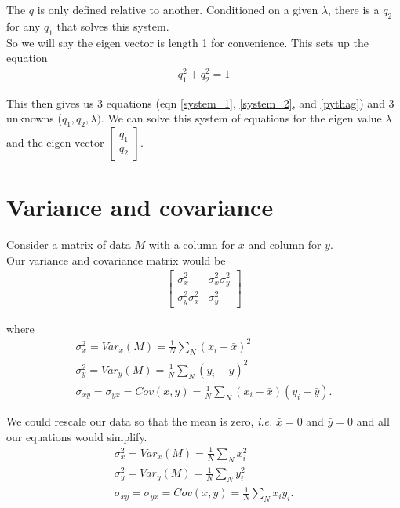 \documentclass{article}
\begin{document}
The $q$ is only defined relative to another. Conditioned on a given $\lambda$, there is a $q_2$ for any $q_1$ that solves this system. \\

So we will say the eigen vector is length 1 for convenience. This sets up the equation 
\begin{align}
    q_1^2 + q_2^2 = 1 \label{pythag}
\end{align}

This then gives us 3 equations (eqn \ref{system_1}, \ref{system_2}, and \ref{pythag})  and 3 unknowns ($q_1, q_2, \lambda).$ We can solve this system of equations for the eigen value $\lambda$ and the eigen vector $\begin{bmatrix}
    q_1\\
    q_2
\end{bmatrix}$.

\section{Variance and covariance}

Consider a matrix of data $M$ with a column for $x$ and column for $y$. \\

Our variance and covariance matrix would be 
\begin{align}
    \begin{bmatrix}
        \sigma_x^2 & \sigma_x^2 \sigma_y^2\\
        \sigma_y^2\sigma_x^2 & \sigma_y^2
    \end{bmatrix} \label{cov}
\end{align}

where 
\begin{align}
    \sigma_x^2 = Var_x(M) = \frac{1}{N} \sum_N (x_i - \bar x) ^2\\
    \sigma_y^2 = Var_y(M) = \frac{1}{N} \sum_N (y_i - \bar y) ^2\\
    \sigma_{xy} = \sigma_{yx} = Cov(x,y) = \frac{1}{N} \sum_N (x_i - \bar x)(y_i - \bar y).
\end{align}

We could rescale our data so that the mean is zero, \textit{i.e.} $\bar x = 0$ and $\bar y = 0 $ and all our equations would simplify. 
\begin{align}
    \sigma_x^2 = Var_x(M) = \frac{1}{N} \sum_N x_i ^2\\
    \sigma_y^2 = Var_y(M) = \frac{1}{N} \sum_N y_i ^2\\
    \sigma_{xy} = \sigma_{yx} = Cov(x,y) = \frac{1}{N} \sum_N x_i y_i.
\end{align}
\end{document}
